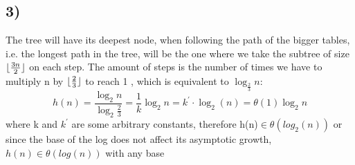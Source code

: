 \documentclass{report}
\begin{document}
\subsection*{3)}

The tree will have its deepest node, when following the path of the bigger tables, i.e. the longest path in the tree, will be the one where we take the subtree  of size $\lfloor\frac{3n}{2}\rfloor$ on each step. The amount of steps is the number of times we have to multiply n  by $\lfloor\frac{2}{3}\rfloor$ to reach 1 , which is equivalent to $\log_{\frac{2}{3}}n$:
\begin{equation*}
    h(n) = \frac{\log_{2}n}{\log_{2}\frac{2}{3}} = \frac{1}{k}\log_{2}n = k^{'}\cdot \log_{2}(n) = \theta(1) \log_{2}n
\end{equation*}
where k and $k^{'}$ are some arbitrary constants, therefore h(n)$\in \theta(log_{2}(n))$ or since the base of the log does not affect its asymptotic growth, $h(n) \in \theta(log(n))$ with any base
\end{document}
